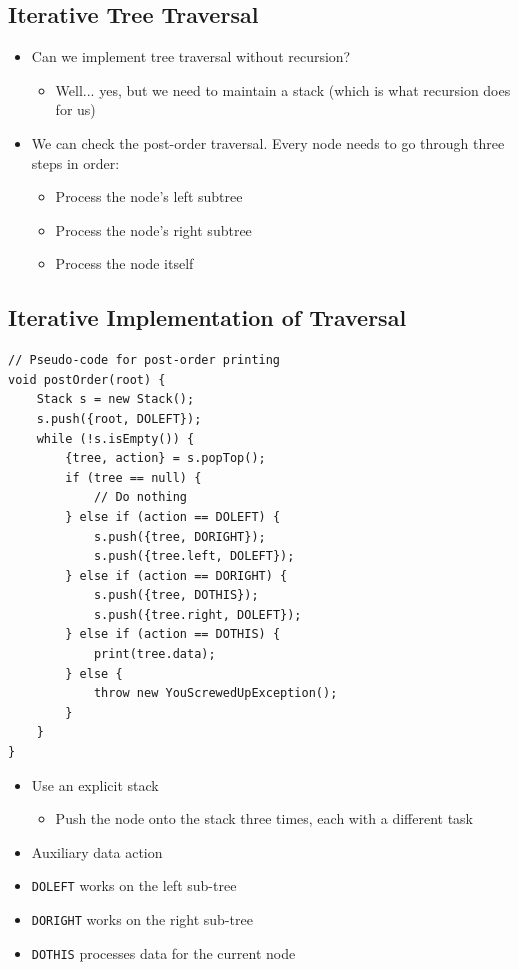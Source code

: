 \documentclass[10pt]{article}
\begin{document}
\subsection*{Iterative Tree Traversal}
\begin{itemize}
    \item Can we implement tree traversal without recursion?
    \begin{itemize}
        \item Well... yes, but we need to maintain a stack (which is what recursion does for us)
    \end{itemize}
    \item We can check the post-order traversal. Every node needs to go through three steps in order:
    \begin{itemize}
        \item Process the node's left subtree
        \item Process the node's right subtree
        \item Process the node itself
    \end{itemize}
\end{itemize}

\subsection*{Iterative Implementation of Traversal}
\begin{verbatim}
// Pseudo-code for post-order printing
void postOrder(root) {
    Stack s = new Stack();
    s.push({root, DOLEFT});
    while (!s.isEmpty()) {
        {tree, action} = s.popTop();
        if (tree == null) {
            // Do nothing
        } else if (action == DOLEFT) {
            s.push({tree, DORIGHT});
            s.push({tree.left, DOLEFT});
        } else if (action == DORIGHT) {
            s.push({tree, DOTHIS});
            s.push({tree.right, DOLEFT});
        } else if (action == DOTHIS) {
            print(tree.data);
        } else {
            throw new YouScrewedUpException();
        }
    }
}
\end{verbatim}
\begin{itemize}
    \item Use an explicit stack
    \begin{itemize}
        \item Push the node onto the stack three times, each with a different task
    \end{itemize}
    \item Auxiliary data action
    \item \texttt{DOLEFT} works on the left sub-tree
    \item \texttt{DORIGHT} works on the right sub-tree
    \item \texttt{DOTHIS} processes data for the current node
\end{itemize}
\end{document}
